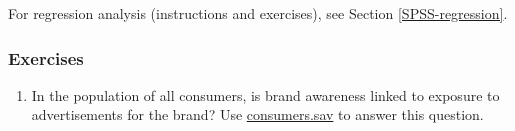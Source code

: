 \documentclass[a4paper]{book}
\providecommand{\tightlist}{%
  \setlength{\itemsep}{0pt}\setlength{\parskip}{0pt}}
\theoremstyle{definition}
\theoremstyle{definition}
\theoremstyle{definition}
\theoremstyle{remark}
\begin{document}
For regression analysis (instructions and exercises), see Section
\ref{SPSS-regression}.

\subsubsection*{Exercises}\label{exercises-14}

\begin{enumerate}
\def\labelenumi{\arabic{enumi}.}
\tightlist
\item
  In the population of all consumers, is brand awareness linked to
  exposure to advertisements for the brand? Use
  \href{http://82.196.4.233:3838/data/consumers.sav}{consumers.sav} to
  answer this question.
\end{enumerate}
\end{document}

